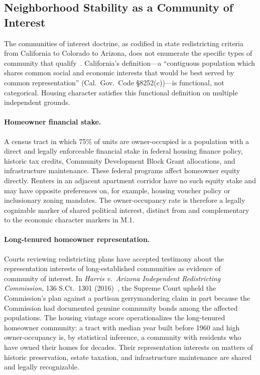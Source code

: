 \label{sec:legal}

\subsection{Neighborhood Stability as a Community of Interest}

The communities of interest doctrine, as codified in state redistricting
criteria from California to Colorado to Arizona, does not enumerate the specific
types of community that qualify~\citep{ncsl2021criteria}.
California's definition---a ``contiguous population which shares common social
and economic interests that would be best served by common representation''
(Cal.\ Gov.\ Code \S 8252(c))---is functional, not categorical.
Housing character satisfies this functional definition on multiple independent
grounds.

\paragraph{Homeowner financial stake.}
A census tract in which 75\% of units are owner-occupied is a population with
a direct and legally enforceable financial stake in federal housing finance
policy, historic tax credits, Community Development Block Grant allocations,
and infrastructure maintenance.
These federal programs affect homeowner equity directly.
Renters in an adjacent apartment corridor have no such equity stake and may
have opposite preferences on, for example, housing voucher policy or
inclusionary zoning mandates.
The owner-occupancy rate is therefore a legally cognizable marker of shared
political interest, distinct from and complementary to the economic character
markers in M.1.

\paragraph{Long-tenured homeowner representation.}
Courts reviewing redistricting plans have accepted testimony about the
representation interests of long-established communities as evidence of
community of interest.
In \textit{Harris v.\ Arizona Independent Redistricting Commission},
136 S.Ct.\ 1301 (2016)~\citep{harris2016}, the Supreme Court upheld the
Commission's plan against a partisan gerrymandering claim in part because
the Commission had documented genuine community bonds among the affected
populations.
The housing vintage score operationalizes the long-tenured homeowner community:
a tract with median year built before 1960 and high owner-occupancy is,
by statistical inference, a community with residents who have owned their
homes for decades.
Their representation interests on matters of historic preservation, estate
taxation, and infrastructure maintenance are shared and legally recognizable.

